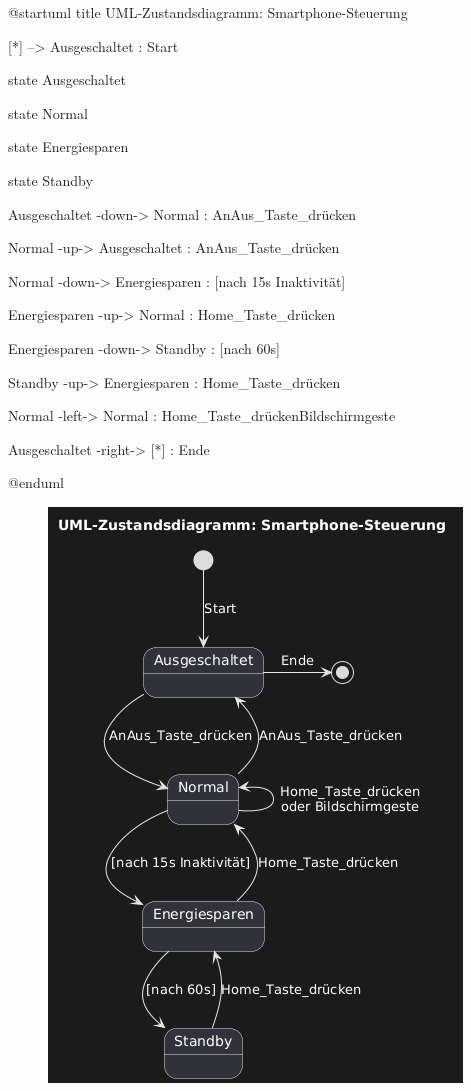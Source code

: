 \documentclass[12pt]{article}
\begin{document}
\begin{plantuml}
@startuml
title UML-Zustandsdiagramm: Smartphone-Steuerung

[*] --> Ausgeschaltet : Start

state Ausgeschaltet

state Normal 

state Energiesparen

state Standby

Ausgeschaltet -down-> Normal : AnAus_Taste_drücken

Normal -up-> Ausgeschaltet : AnAus_Taste_drücken

Normal -down-> Energiesparen : [nach 15s Inaktivität]

Energiesparen -up-> Normal : Home_Taste_drücken

Energiesparen -down-> Standby : [nach 60s]

Standby -up-> Energiesparen : Home_Taste_drücken

Normal -left-> Normal : Home_Taste_drücken\noder Bildschirmgeste

Ausgeschaltet -right-> [*] : Ende

@enduml
  
\end{plantuml}


\begin{figure}[H]
    \centering
    \includegraphics[width=\linewidth, height=0.6\textheight,keepaspectratio]{resources/images_4/3.png}
  \end{figure}
\end{document}
